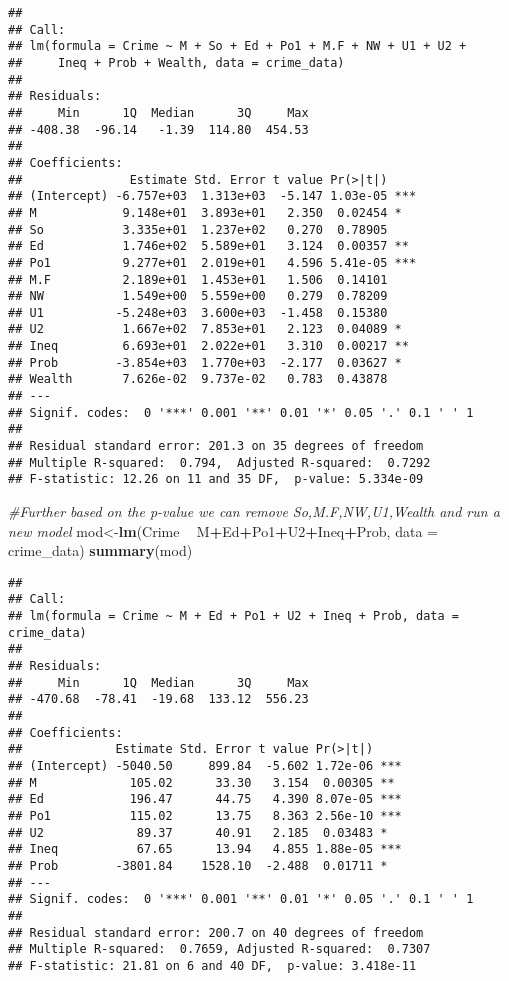 \documentclass[
]{article}
\newenvironment{Shaded}{\begin{snugshade}}{\end{snugshade}}
\newcommand{\CommentTok}[1]{\textcolor[rgb]{0.56,0.35,0.01}{\textit{#1}}}
\newcommand{\DataTypeTok}[1]{\textcolor[rgb]{0.13,0.29,0.53}{#1}}
\newcommand{\KeywordTok}[1]{\textcolor[rgb]{0.13,0.29,0.53}{\textbf{#1}}}
\newcommand{\NormalTok}[1]{#1}
\newcommand{\OperatorTok}[1]{\textcolor[rgb]{0.81,0.36,0.00}{\textbf{#1}}}
\newcommand{\StringTok}[1]{\textcolor[rgb]{0.31,0.60,0.02}{#1}}
\begin{document}
\begin{verbatim}
## 
## Call:
## lm(formula = Crime ~ M + So + Ed + Po1 + M.F + NW + U1 + U2 + 
##     Ineq + Prob + Wealth, data = crime_data)
## 
## Residuals:
##     Min      1Q  Median      3Q     Max 
## -408.38  -96.14   -1.39  114.80  454.53 
## 
## Coefficients:
##               Estimate Std. Error t value Pr(>|t|)    
## (Intercept) -6.757e+03  1.313e+03  -5.147 1.03e-05 ***
## M            9.148e+01  3.893e+01   2.350  0.02454 *  
## So           3.335e+01  1.237e+02   0.270  0.78905    
## Ed           1.746e+02  5.589e+01   3.124  0.00357 ** 
## Po1          9.277e+01  2.019e+01   4.596 5.41e-05 ***
## M.F          2.189e+01  1.453e+01   1.506  0.14101    
## NW           1.549e+00  5.559e+00   0.279  0.78209    
## U1          -5.248e+03  3.600e+03  -1.458  0.15380    
## U2           1.667e+02  7.853e+01   2.123  0.04089 *  
## Ineq         6.693e+01  2.022e+01   3.310  0.00217 ** 
## Prob        -3.854e+03  1.770e+03  -2.177  0.03627 *  
## Wealth       7.626e-02  9.737e-02   0.783  0.43878    
## ---
## Signif. codes:  0 '***' 0.001 '**' 0.01 '*' 0.05 '.' 0.1 ' ' 1
## 
## Residual standard error: 201.3 on 35 degrees of freedom
## Multiple R-squared:  0.794,  Adjusted R-squared:  0.7292 
## F-statistic: 12.26 on 11 and 35 DF,  p-value: 5.334e-09
\end{verbatim}

\begin{Shaded}
\begin{Highlighting}[]
\CommentTok{#Further based on the p-value we can remove So,M.F,NW,U1,Wealth and run a new model}
\NormalTok{mod<-}\KeywordTok{lm}\NormalTok{(Crime }\OperatorTok{~}\StringTok{ }\NormalTok{M}\OperatorTok{+}\NormalTok{Ed}\OperatorTok{+}\NormalTok{Po1}\OperatorTok{+}\NormalTok{U2}\OperatorTok{+}\NormalTok{Ineq}\OperatorTok{+}\NormalTok{Prob, }
        \DataTypeTok{data =}\NormalTok{ crime_data)}
\KeywordTok{summary}\NormalTok{(mod)}
\end{Highlighting}
\end{Shaded}

\begin{verbatim}
## 
## Call:
## lm(formula = Crime ~ M + Ed + Po1 + U2 + Ineq + Prob, data = crime_data)
## 
## Residuals:
##     Min      1Q  Median      3Q     Max 
## -470.68  -78.41  -19.68  133.12  556.23 
## 
## Coefficients:
##             Estimate Std. Error t value Pr(>|t|)    
## (Intercept) -5040.50     899.84  -5.602 1.72e-06 ***
## M             105.02      33.30   3.154  0.00305 ** 
## Ed            196.47      44.75   4.390 8.07e-05 ***
## Po1           115.02      13.75   8.363 2.56e-10 ***
## U2             89.37      40.91   2.185  0.03483 *  
## Ineq           67.65      13.94   4.855 1.88e-05 ***
## Prob        -3801.84    1528.10  -2.488  0.01711 *  
## ---
## Signif. codes:  0 '***' 0.001 '**' 0.01 '*' 0.05 '.' 0.1 ' ' 1
## 
## Residual standard error: 200.7 on 40 degrees of freedom
## Multiple R-squared:  0.7659, Adjusted R-squared:  0.7307 
## F-statistic: 21.81 on 6 and 40 DF,  p-value: 3.418e-11
\end{verbatim}
\end{document}
